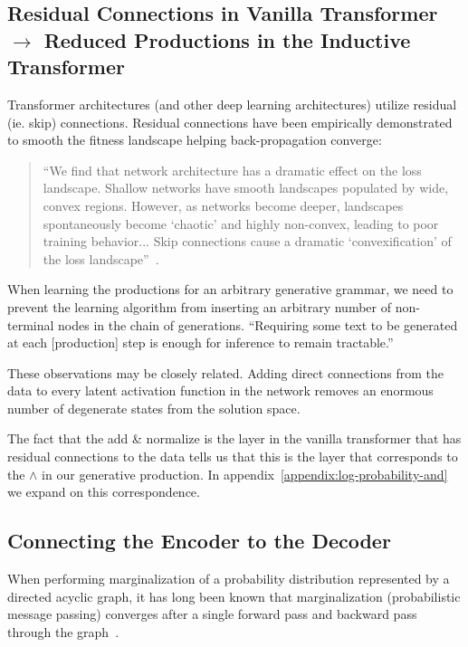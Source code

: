 \documentclass{article}
\begin{document}
\subsection{Residual Connections in Vanilla Transformer $\rightarrow$ Reduced Productions in the Inductive Transformer}\label{appendix:residual-connection}

Transformer architectures (and other deep learning architectures) utilize residual (ie. skip) connections.  Residual connections have been empirically demonstrated to smooth the fitness landscape helping back-propagation converge:

\begin{quote}
``We find that network architecture has a dramatic effect on the loss landscape. Shallow networks have smooth landscapes populated by wide, convex regions. However, as networks become deeper, landscapes spontaneously become `chaotic' and highly non-convex, leading to poor training behavior... Skip connections cause a dramatic `convexification' of the loss landscape''~\citep{DBLP:journals/corr/abs-1712-09913}.
\end{quote}

When learning the productions for an arbitrary generative grammar, we need to prevent the learning algorithm from inserting an arbitrary number of non-terminal nodes in the chain of generations. ``Requiring
some text to be generated at each [production] step is enough for inference to remain tractable.''~\citep{malik2021generative}

These observations may be closely related.  Adding direct connections from the data to every latent activation function in the network removes an enormous number of degenerate states from the solution space.

The fact that the add \& normalize is the layer in the vanilla transformer that has residual connections to the data tells us that this is the layer that corresponds to the $\land$ in our generative production.  In appendix~\ref{appendix:log-probability-and} we expand on this correspondence.


\subsection{Connecting the Encoder to the Decoder}
\label{appendix:connecting-encoder-to-decoder}

When performing marginalization of a probability distribution represented by a directed acyclic graph, it has long been known that marginalization (probabilistic message passing) converges after a single forward pass and backward pass through the graph~\citep{pearl1988probabilistic, mackay2003information}.
\end{document}
